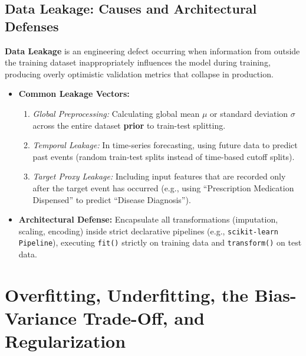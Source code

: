 \subsection{Data Leakage: Causes and Architectural Defenses}
\textbf{Data Leakage} is an engineering defect occurring when information from outside the training dataset inappropriately influences the model during training, producing overly optimistic validation metrics that collapse in production.
\begin{itemize}
    \item \textbf{Common Leakage Vectors:}
    \begin{enumerate}
        \item \textit{Global Preprocessing:} Calculating global mean $\mu$ or standard deviation $\sigma$ across the entire dataset \textbf{prior} to train-test splitting.
        \item \textit{Temporal Leakage:} In time-series forecasting, using future data to predict past events (random train-test splits instead of time-based cutoff splits).
        \item \textit{Target Proxy Leakage:} Including input features that are recorded only after the target event has occurred (e.g., using ``Prescription Medication Dispensed'' to predict ``Disease Diagnosis'').
    \end{enumerate}
    \item \textbf{Architectural Defense:} Encapsulate all transformations (imputation, scaling, encoding) inside strict declarative pipelines (e.g., \texttt{scikit-learn Pipeline}), executing \texttt{fit()} strictly on training data and \texttt{transform()} on test data.
\end{itemize}


\section{Overfitting, Underfitting, the Bias-Variance Trade-Off, and Regularization}
\label{sec:overfitting_underfitting}

